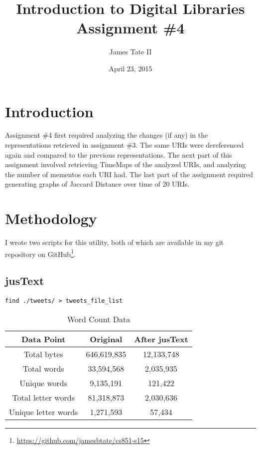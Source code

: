 \documentclass[a4paper,12pt]{article}
\begin{document}
\renewcommand{\thelstlisting}{\thesection.\arabic{lstlisting}}
\renewcommand{\thefigure}{\arabic{section}.\arabic{figure}}
\renewcommand{\thetable}{\arabic{section}.\arabic{table}}
\setlength{\floatsep}{0pt plus 2pt minus 2pt}

\title{Introduction to Digital Libraries Assignment \#4}
\date{April 23, 2015}
\author{James Tate II}
\maketitle

\section{Introduction}
Assignment \#4 first required analyzing the changes (if any) in the representations retrieved
in assignment \#3. The same URIs were dereferenced again and compared to the previous
representations. The next part of this assignment involved retrieving TimeMaps of the
analyzed URIs, and analyzing the number of mementos each URI had. The last part of the
assignment required generating graphs of Jaccard Distance over time of 20 URIs.

\section{Methodology}
I wrote two scripts for this utility, both of which are available in my git repository on
GitHub\footnote{\url{https://github.com/jamesbtate/cs851-s15}}.

\subsection{jusText}

\begin{lstlisting}[basicstyle=\ttfamily,caption={Generating list of files in tweets directory}]
    find ./tweets/ > tweets_file_list
\end{lstlisting}

\begin{table}[H]
\centering
\caption{Word Count Data}
\begin{tabular}{ | c | c | c | }
\hline
\textbf{Data Point}  & \textbf{Original} & \textbf{After jusText} \\ \hline
Total bytes          & 646,619,835  & 12,133,748    \\ \hline
Total words          & 33,594,568   & 2,035,935     \\ \hline
Unique words         & 9,135,191    & 121,422       \\ \hline
Total letter words   & 81,318,873   & 2,030,636     \\ \hline
Unique letter words  & 1,271,593    & 57,434        \\ \hline
\end{tabular}
\end{table}




\end{document}
